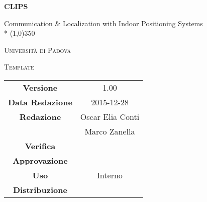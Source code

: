 \documentclass[a4paper,12pt]{article}
\author{Oscar Elia Conti, Marco Zanella}
\date{24/12/2015}
\begin{document}
\begin{titlepage}
	\centering
	{\huge\bfseries CLIPS\par}
	Communication \& Localization with Indoor Positioning Systems \\*
	\line(1,0){350} \\
	{\scshape\LARGE Università di Padova \par}
	\vspace{1cm}
	{\scshape\Large Template \par}
	\logo
	\newpage
		\begin{tabular}{c|c}
			{\hfill \textbf{Versione}} 			& 1.00			\\
			{\hfill\textbf{Data Redazione}} 		& 2015-12-28  		\\ 
			{\hfill\textbf{Redazione}} 			&  Oscar Elia Conti  \\ 
											& Marco Zanella      \\
			{\hfill\textbf{Verifica}} 				&  \\ 
			{\hfill\textbf{Approvazione}} 		&  \\
			{\hfill\textbf{Uso}} 					& Interno			\\
			{\hfill\textbf{Distribuzione}} 			& \leaf			\\
		\end{tabular}
	\end{titlepage}
	\newpage
	
	
	\newpage
	\tableofcontents	
	\label{LastFrontPage}
	\newpage
	\pagestyle{mymain}
         
         	\newpage
		

	\newpage
		
	
	\newpage
		
	
	\newpage
		
		
	\label{LastPage}
\end{document}
